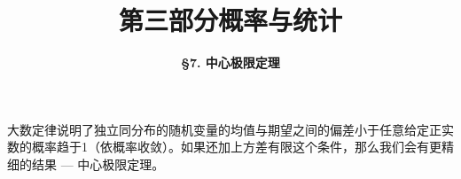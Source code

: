 



\title[Probability \& Statistics]{\LARGE \bfseries 第三部分\quad 概率与统计} %
\author[Central Limit Theorem] %
{\Large \bfseries \S 7. 中心极限定理}
\date{}






\begin{frame}

\titlepage %

\end{frame}





\begin{frame}

{
\large
大数定律说明了独立同分布的随机变量的均值与期望之间的偏差小于任意给定正实数的概率趋于1（依概率收敛）。如果还加上方差有限这个条件，那么我们会有更精细的结果 --- 中心极限定理。
}

\end{frame}

